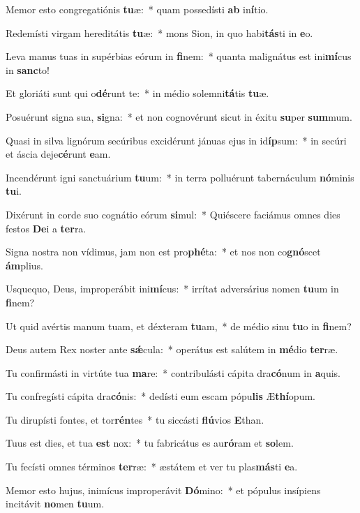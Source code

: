 \item Memor esto congregatiónis \textbf{tu}æ:~* quam possedísti \textbf{ab} in\textbf{í}tio.
\item Redemísti virgam hereditátis \textbf{tu}æ:~* mons Sion, in quo habi\textbf{tás}ti in \textbf{e}o.
\item Leva manus tuas in supérbias eórum in \textbf{fi}nem:~* quanta malignátus est ini\textbf{mí}cus in \textbf{sanc}to!
\item Et gloriáti sunt qui o\textbf{dé}runt te:~* in médio solemni\textbf{tá}tis \textbf{tu}æ.
\item Posuérunt signa sua, \textbf{si}gna:~* et non cognovérunt sicut in éxitu \textbf{su}per \textbf{sum}mum.
\item Quasi in silva lignórum secúribus excidérunt jánuas ejus in id\textbf{íp}sum:~* in secúri et áscia deje\textbf{cé}runt \textbf{e}am.
\item Incendérunt igni sanctuárium \textbf{tu}um:~* in terra polluérunt tabernáculum \textbf{nó}minis \textbf{tu}i.
\item Dixérunt in corde suo cognátio eórum \textbf{si}mul:~* Quiéscere faciámus omnes dies festos \textbf{De}i a \textbf{ter}ra.
\item Signa nostra non vídimus, jam non est pro\textbf{phé}ta:~* et nos non co\textbf{gnó}scet \textbf{ám}plius.
\item Usquequo, Deus, improperábit ini\textbf{mí}cus:~* irrítat adversárius nomen \textbf{tu}um in \textbf{fi}nem?
\item Ut quid avértis manum tuam, et déxteram \textbf{tu}am,~* de médio sinu \textbf{tu}o in \textbf{fi}nem?
\item Deus autem Rex noster ante \textbf{sǽ}cula:~* operátus est salútem in \textbf{mé}dio \textbf{ter}ræ.
\item Tu confirmásti in virtúte tua \textbf{ma}re:~* contribulásti cápita dra\textbf{có}num in \textbf{a}quis.
\item Tu confregísti cápita dra\textbf{có}nis:~* dedísti eum escam pópu\textbf{lis} Æ\textbf{thí}opum.
\item Tu dirupísti fontes, et tor\textbf{rén}tes~* tu siccásti \textbf{flú}vios \textbf{E}than.
\item Tuus est dies, et tua \textbf{est} nox:~* tu fabricátus es au\textbf{ró}ram et \textbf{so}lem.
\item Tu fecísti omnes términos \textbf{ter}ræ:~* æstátem et ver tu plas\textbf{más}ti \textbf{e}a.
\item Memor esto hujus, inimícus improperávit \textbf{Dó}mino:~* et pópulus insípiens incitávit \textbf{no}men \textbf{tu}um.
